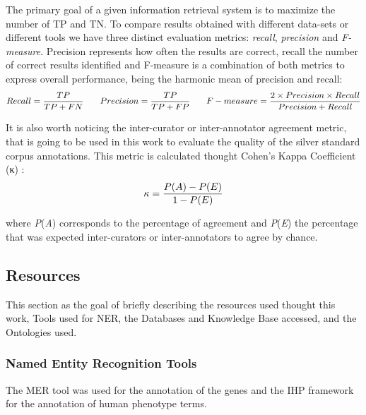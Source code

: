 \documentclass[11pt]{article}
\begin{document}
The primary goal of a given information retrieval system is to maximize the number of TP and TN. To compare results obtained with different data-sets or different tools we have three distinct evaluation metrics: \textit{recall}, \textit{precision} and \textit{F-measure}. Precision represents how often the results are correct, recall the number of correct results identified and F-measure is a combination of both metrics to express overall performance, being the harmonic mean of precision and recall:
\begin{equation}
\small
\renewcommand\theequation{2.1}
Recall = \frac{TP}{TP + FN}
\qquad
Precision = \frac{TP}{TP + FP}
\qquad
F-measure = \frac{2\times Precision\times Recall}{Precision + Recall}
\label{equation:evaluation}
\end{equation}

It is also worth noticing the inter-curator or inter-annotator agreement metric, that is going to be used in this work to evaluate the quality of the silver standard corpus annotations. This metric is calculated thought Cohen's Kappa Coefficient (κ) \cite{doi:10.1177/001316446002000104}:
\begin{equation}
\small
\renewcommand\theequation{2.2}
\kappa = \frac{P(A) - P(E)}{1 - P(E)}
\label{equation:agreement}
\end{equation}

where \textit{P}(\textit{A}) corresponds to the percentage of agreement and \textit{P}(\textit{E}) the percentage that was expected inter-curators or inter-annotators to agree by chance.


\subsection{Resources}

This section as the goal of briefly describing the resources used thought this work, Tools used for NER, the Databases and Knowledge Base accessed, and the Ontologies used.


\subsubsection{Named Entity Recognition Tools}

The MER tool was used \cite{MER} for the annotation of the genes and the IHP framework \cite{IHP} for the annotation of human phenotype terms.
\end{document}
